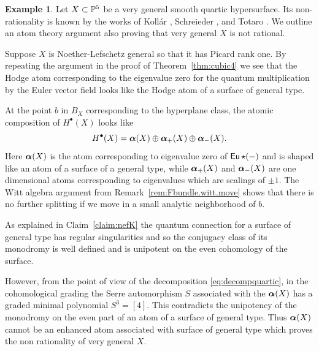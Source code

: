 \documentclass[twoside,leqno]{article}
\numberwithin{equation}{section}
\theoremstyle{plain}
\theoremstyle{definition}
\newtheorem{example}[equation]{Example}
\begin{document}
\begin{example} \label{ex:4dimquartic}
Let $X \subset \mathbb P^5$ be a very general smooth quartic hypersurface. Its non-rationality is known by  the works of Koll\'{a}r \cite{KOL}, Schreieder \cite{SCH}, and Totaro \cite{TOT}. We outline an atom
theory argument also  proving that very general $X$ is not rational.



Suppose $X$ is Noether-Lefschetz general so that it has  Picard rank one. 
By repeating the argument in the proof of
Theorem~\ref{thm:cubic4} we see that the Hodge atom corresponding to
the eigenvalue zero for the quantum multiplication by the Euler vector
field looks like the Hodge atom of a surface of general type.

At the point $b$ in $B_{X}$ corresponding to the hyperplane class, the atomic composition  of $H^{\bullet}(X)$ looks like
\begin{equation} \label{eq:decompquartic}
H^{\bullet}(X)= \boldsymbol{\alpha}(X)\oplus \boldsymbol{\alpha}_{+}(X)\oplus \boldsymbol{\alpha}_{-}(X).
\end{equation}
Here $\boldsymbol{\alpha}(X)$ is the atom corresponding to eigenvalue zero of $\operatorname{\mathsf{Eu}}\star (-)$ and is 
shaped like an atom of a surface of a general type, while $\boldsymbol{\alpha}_{+}(X)$ and $\boldsymbol{\alpha}_{-}(X)$ are one dimensional atoms corresponding to eigenvalues which are scalings of $\pm 1$. 
The  Witt algebra argument from Remark~\ref{rem:Fbundle.witt.move} shows that  there is no further splitting if we move in a small analytic neighborhood of $b$.


As explained in Claim~\ref{claim:nefK} the quantum connection for a surface of general type has regular singularities and so the conjugacy class of its monodromy is well
defined and is unipotent on the even cohomology of the surface. 

However, from the point of view of the decomposition \eqref{eq:decompquartic}, in the cohomological grading the Serre automorphism  $S$ associated with the $\boldsymbol{\alpha}(X)$ has a graded minimal polynomial
$S^3=[4]$.
This contradicts the unipotency of the monodromy on the even part of an atom of a surface of general type. Thus $\boldsymbol{\alpha}(X)$ cannot be an enhanced atom associated with surface of general type which proves the non rationality of  very general $X$. 
\end{example}
\end{document}
